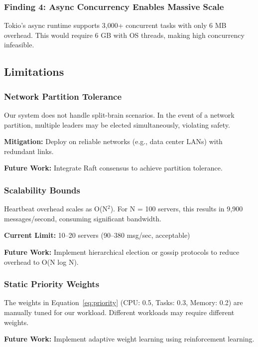 \documentclass[12pt,a4paper]{article}
\begin{document}
\subsubsection{Finding 4: Async Concurrency Enables Massive Scale}

Tokio's async runtime supports 3,000+ concurrent tasks with only 6 MB overhead. This would require 6 GB with OS threads, making high concurrency infeasible.

\subsection{Limitations}

\subsubsection{Network Partition Tolerance}

Our system does not handle split-brain scenarios. In the event of a network partition, multiple leaders may be elected simultaneously, violating safety.

\textbf{Mitigation:} Deploy on reliable networks (e.g., data center LANs) with redundant links.

\textbf{Future Work:} Integrate Raft consensus to achieve partition tolerance.

\subsubsection{Scalability Bounds}

Heartbeat overhead scales as O(N$^2$). For N = 100 servers, this results in 9,900 messages/second, consuming significant bandwidth.

\textbf{Current Limit:} 10--20 servers (90--380 msg/sec, acceptable)

\textbf{Future Work:} Implement hierarchical election or gossip protocols to reduce overhead to O(N log N).

\subsubsection{Static Priority Weights}

The weights in Equation~\ref{eq:priority} (CPU: 0.5, Tasks: 0.3, Memory: 0.2) are manually tuned for our workload. Different workloads may require different weights.

\textbf{Future Work:} Implement adaptive weight learning using reinforcement learning.
\end{document}
